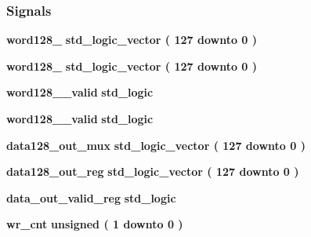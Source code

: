 \subsubsection*{Signals}
 \begin{DoxyCompactItemize}
\item 
{\bf word128\+\_} {\bfseries \textcolor{comment}{std\+\_\+logic\+\_\+vector}\textcolor{vhdlchar}{ }\textcolor{vhdlchar}{(}\textcolor{vhdlchar}{ }\textcolor{vhdlchar}{ } \textcolor{vhdldigit}{127} \textcolor{vhdlchar}{ }\textcolor{keywordflow}{downto}\textcolor{vhdlchar}{ }\textcolor{vhdlchar}{ } \textcolor{vhdldigit}{0} \textcolor{vhdlchar}{ }\textcolor{vhdlchar}{)}\textcolor{vhdlchar}{ }} 
\item 
{\bf word128\+\_} {\bfseries \textcolor{comment}{std\+\_\+logic\+\_\+vector}\textcolor{vhdlchar}{ }\textcolor{vhdlchar}{(}\textcolor{vhdlchar}{ }\textcolor{vhdlchar}{ } \textcolor{vhdldigit}{127} \textcolor{vhdlchar}{ }\textcolor{keywordflow}{downto}\textcolor{vhdlchar}{ }\textcolor{vhdlchar}{ } \textcolor{vhdldigit}{0} \textcolor{vhdlchar}{ }\textcolor{vhdlchar}{)}\textcolor{vhdlchar}{ }} 
\item 
{\bf word128\+\_\+\_\+valid} {\bfseries \textcolor{comment}{std\+\_\+logic}\textcolor{vhdlchar}{ }} 
\item 
{\bf word128\+\_\+\_\+valid} {\bfseries \textcolor{comment}{std\+\_\+logic}\textcolor{vhdlchar}{ }} 
\item 
{\bf data128\+\_\+out\+\_\+mux} {\bfseries \textcolor{comment}{std\+\_\+logic\+\_\+vector}\textcolor{vhdlchar}{ }\textcolor{vhdlchar}{(}\textcolor{vhdlchar}{ }\textcolor{vhdlchar}{ } \textcolor{vhdldigit}{127} \textcolor{vhdlchar}{ }\textcolor{keywordflow}{downto}\textcolor{vhdlchar}{ }\textcolor{vhdlchar}{ } \textcolor{vhdldigit}{0} \textcolor{vhdlchar}{ }\textcolor{vhdlchar}{)}\textcolor{vhdlchar}{ }} 
\item 
{\bf data128\+\_\+out\+\_\+reg} {\bfseries \textcolor{comment}{std\+\_\+logic\+\_\+vector}\textcolor{vhdlchar}{ }\textcolor{vhdlchar}{(}\textcolor{vhdlchar}{ }\textcolor{vhdlchar}{ } \textcolor{vhdldigit}{127} \textcolor{vhdlchar}{ }\textcolor{keywordflow}{downto}\textcolor{vhdlchar}{ }\textcolor{vhdlchar}{ } \textcolor{vhdldigit}{0} \textcolor{vhdlchar}{ }\textcolor{vhdlchar}{)}\textcolor{vhdlchar}{ }} 
\item 
{\bf data\+\_\+out\+\_\+valid\+\_\+reg} {\bfseries \textcolor{comment}{std\+\_\+logic}\textcolor{vhdlchar}{ }} 
\item 
{\bf wr\+\_\+cnt} {\bfseries \textcolor{comment}{unsigned}\textcolor{vhdlchar}{ }\textcolor{vhdlchar}{(}\textcolor{vhdlchar}{ }\textcolor{vhdlchar}{ } \textcolor{vhdldigit}{1} \textcolor{vhdlchar}{ }\textcolor{keywordflow}{downto}\textcolor{vhdlchar}{ }\textcolor{vhdlchar}{ } \textcolor{vhdldigit}{0} \textcolor{vhdlchar}{ }\textcolor{vhdlchar}{)}\textcolor{vhdlchar}{ }} 

\end{DoxyCompactItemize}
